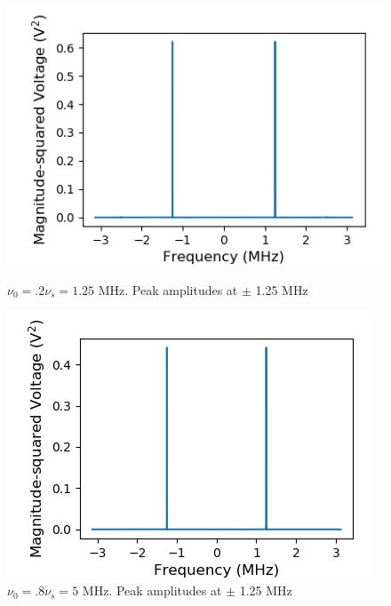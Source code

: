 \documentclass[a4paper]{article}
\begin{document}
\begin{figure}
\centering
\begin{minipage}{.5\textwidth}
	\centering
	\includegraphics[width=.8\linewidth]{5-2/pow2}
	\caption{$\nu_0 = .2 \nu_s = 1.25$ MHz. Peak amplitudes at $\pm$ 1.25 MHz}
	\label{fig:NyPw2}
\end{minipage}%
\begin{minipage}{.5\textwidth}
	\centering
	\includegraphics[width=.8\linewidth]{5-2/pow8}
	\caption{$\nu_0 = .8 \nu_s = 5$ MHz. Peak amplitudes at $\pm$ 1.25 MHz}
	\label{fig:NyPw8}
\end{minipage}
\end{figure}
\end{document}

